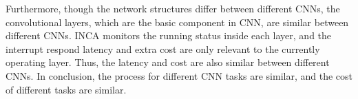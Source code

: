 Furthermore, though the network structures differ between different CNNs, the convolutional layers, which are the basic component in CNN, are similar between different CNNs. INCA monitors the running status inside each layer, and the interrupt respond latency and extra cost are only relevant to the currently operating layer. Thus, the latency and cost are also similar between different CNNs. In conclusion, the process for different CNN tasks are similar, and the cost of different tasks are similar.



